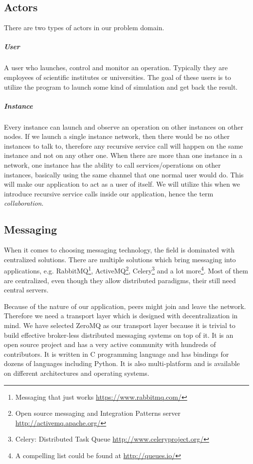 \subsection{Actors}
There are two types of actors in our problem domain.
\subparagraph{User}
A user who launches, control and monitor an operation. Typically they are employees of scientific institutes or universities.
The goal of these users is to utilize the program to launch some kind of simulation and get back the result.
\subparagraph{Instance}
Every instance can launch and observe an operation on other instances on other nodes. If we launch a single instance
network, then there would be no other instances to talk to, therefore any recursive service call will happen on the
same instance and not on any other one.
When there are more than one instance in a network, one instance has the ability to call services/operations on other
instances, basically using the same channel that one normal user would do. This will make our application to act as a user
of itself. We will utilize this when we introduce recursive service calls inside our application, hence the term
\textit{collaboration}.

\subsection{Messaging}
When it comes to choosing messaging technology, the field is dominated with centralized solutions.
There are multiple solutions which bring messaging into applications, 
e.g. RabbitMQ\footnote{Messaging that just works \url{https://www.rabbitmq.com/}}, 
ActiveMQ\footnote{Open source messaging and Integration Patterns server \url{http://activemq.apache.org/}},
 Celery\footnote{Celery: Distributed Task Queue \url{http://www.celeryproject.org/}} and a lot more\footnote{A compelling list could be found at \url{http://queues.io/}}.
Most of them are centralized, even though they allow
distributed paradigms, their still need central servers.

Because of the nature of our application, peers might join and leave the network.
Therefore we need a transport layer which is designed with decentralization in mind. 
We have selected ZeroMQ as our transport layer 
because it is trivial to build effective broker-less distributed messaging systems on top of it.
It is an open source project and has a very active community with hundreds of contributors. 
It is written in C programming language and has bindings for dozens of languages including Python.
It is also multi-platform and is available on different architectures and operating systems.

